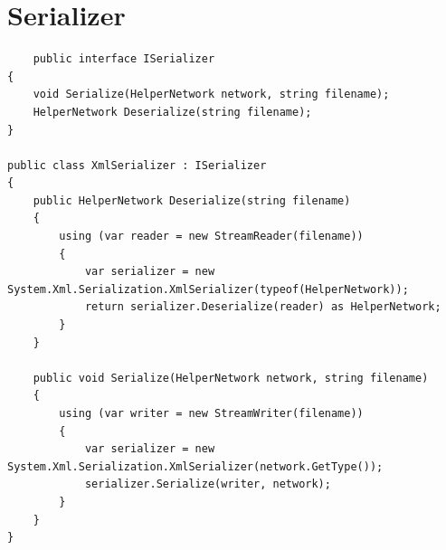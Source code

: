 \documentclass[12pt,a4paper]{article}
\begin{document}
	\section*{Serializer}
	\begin{lstlisting}
	public interface ISerializer
{
    void Serialize(HelperNetwork network, string filename);
    HelperNetwork Deserialize(string filename);
}

public class XmlSerializer : ISerializer
{
    public HelperNetwork Deserialize(string filename)
    {
        using (var reader = new StreamReader(filename))
        {
            var serializer = new System.Xml.Serialization.XmlSerializer(typeof(HelperNetwork));
            return serializer.Deserialize(reader) as HelperNetwork;
        }
    }

    public void Serialize(HelperNetwork network, string filename)
    {
        using (var writer = new StreamWriter(filename))
        {
            var serializer = new System.Xml.Serialization.XmlSerializer(network.GetType());
            serializer.Serialize(writer, network);
        }
    }
}
	\end{lstlisting}
	
\end{document}
